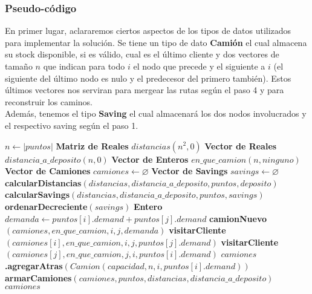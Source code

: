 \subsubsection{Pseudo-código}
En primer lugar, aclararemos ciertos aspectos de los tipos de datos utilizados para implementar la solución. Se tiene un tipo de dato \textbf{Camión} el cual almacena su stock disponible, si es válido, cual es el último cliente y dos vectores de tamaño $n$ que indican para todo $i$ el nodo que precede y el siguiente a $i$ (el siguiente del último nodo es nulo y el predecesor del primero también). Estos últimos vectores nos serviran para mergear las rutas según el paso 4 y para reconstruir los caminos. \\
Además, tenemos el tipo \textbf{Saving} el cual almacenará los dos nodos involucrados y el respectivo saving según el paso 1.

\begin{algorithm}[H]
	\caption{\Comment $\mathcal{O}(n^{3})$}
	\begin{algorithmic}[1]
		\State $n \gets |puntos|$
		\State \textbf{Matriz de Reales} $distancias\mathcal{}(n^{2}, 0)$
		\State \textbf{Vector de Reales} $distancia\_a\_deposito\mathcal{}(n, 0)$
		\State \textbf{Vector de Enteros} $en\_que\_camion\mathcal{}(n, ninguno)$
		\State \textbf{Vector de Camiones} $camiones \gets \varnothing$
		\State \textbf{Vector de Savings} $savings \gets \varnothing$
		\Statex
		\State \textbf{calcularDistancias}$(distancias, distancia\_a\_deposito, puntos, deposito)$ 
		\State \textbf{calcularSavings}$(distancias, distancia\_a\_deposito, puntos, savings)$ 
		\State \textbf{ordenarDecreciente}$(savings)$
		\Statex
		\State \textbf{Entero } $demanda \gets  puntos[i].demand + puntos[j].demand$
		\State \textbf{camionNuevo}$(camiones, en\_que\_camion, i, j, demanda)$
		\EndIf
		\EndIf
		\State \textbf{visitarCliente}$(camiones[i], en\_que\_camion, i, j, puntos[j].demand)$
		\EndIf
		\EndIf
		\State \textbf{visitarCliente}$(camiones[j], en\_que\_camion, j, i, puntos[i].demand)$
		\EndIf
		\EndIf
		\EndIf
		\EndIf
		\EndWhile
		\Statex
		\State $camiones$\textbf{.agregarAtras}$(Camion(capacidad, n, i, puntos[i].demand))$
		\EndIf
		\State \textbf{armarCamiones}$(camiones, puntos, distancias, distancia\_a\_deposito)$
		\State \Return $camiones$
		\EndFunction
	\end{algorithmic}
\end{algorithm}

